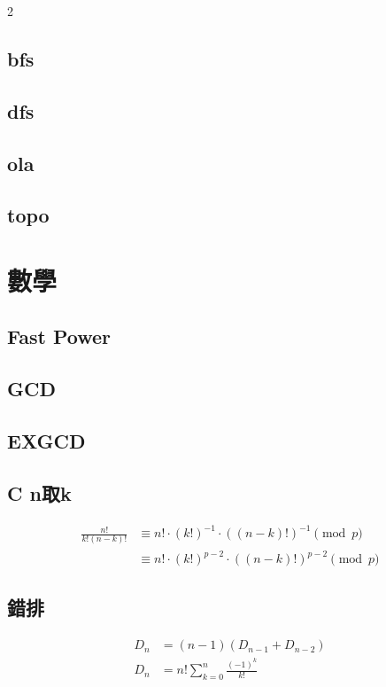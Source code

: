 \documentclass[10pt,a4paper]{article}
\begin{document}
\begin{multicols}{2}
\subsection{bfs}

\subsection{dfs}

\subsection{ola}

\subsection{topo}


\section{數學}

\subsection{Fast Power}

\subsection{GCD}

\subsection{EXGCD}

\subsection{C n取k}
\begin{equation}
\begin{split}
\frac{n!}{k!(n-k)!} &\equiv n! \cdot (k!)^{-1}\cdot ((n-k)!)^{-1} \pmod p \\
&\equiv n! \cdot (k!)^{p-2} \cdot ((n-k)!)^{p-2} \pmod p
\end{split}
\end{equation}

\subsection{錯排}
\begin{align*}
D_n &= (n-1)(D_{n-1} + D_{n-2}) \\
D_n &= n!\sum_{k=0}^{n}\frac{(-1)^k}{k!}
\end{align*}

\end{multicols}
\end{document}
